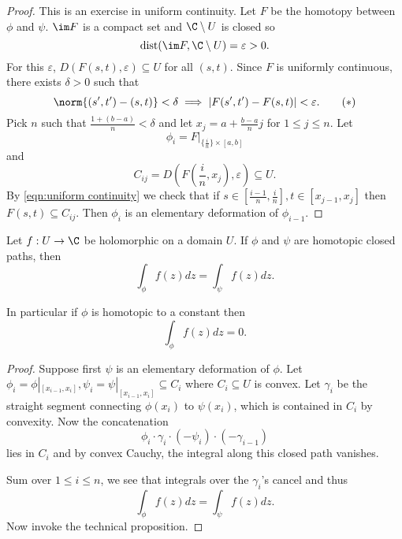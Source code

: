 \documentclass[a4paper]{article}
\begin{document}
\begin{proof}
  This is an exercise in uniform continuity. Let \(F\) be the homotopy between \(\phi\) and \(\psi\). \(\im F\) is a compact set and \(\C \setminus U\) is closed so
  \[
    \operatorname{dist}(\im F, \C \setminus U) = \varepsilon > 0.
  \]
  For this \(\varepsilon\), \(D(F(s, t), \varepsilon) \subseteq U\) for all \((s, t)\). Since \(F\) is uniformly continuous, there exists \(\delta > 0\) such that
  \begin{equation}
    \label{eqn:uniform continuity}
    \norm{(s', t') - (s, t)} < \delta \implies |F(s', t') - F(s, t)| < \varepsilon.
    \tag{\(\ast\)}
  \end{equation}
  Pick \(n\) such that \(\frac{1 + (b - a)}{n} < \delta\) and let \(x_j = a + \frac{b - a}{n}j\) for \(1 \leq j \leq n\). Let
  \[
    \phi_i = F|_{\{\frac{i}{n}\} \times [a, b]}
  \]
  and
  \[
    C_{ij} = D(F(\frac{i}{n}, x_j), \varepsilon) \subseteq U.
  \]
  By \eqref{eqn:uniform continuity} we check that if \(s \in [\frac{i - 1}{n}, \frac{i}{n}], t \in [x_{j - 1}, x_j]\) then \(F(s, t) \subseteq C_{ij}\). Then \(\phi_i\) is an elementary deformation of \(\phi_{i - 1}\).
\end{proof}

\begin{theorem}
  \label{thm:homotopic Cauchy}
  Let \(f: U \to \C\) be holomorphic on a domain \(U\). If \(\phi\) and \(\psi\) are homotopic closed paths, then
  \[
    \int_\phi f(z) dz = \int_\psi f(z) dz.
  \]

  In particular if \(\phi\) is homotopic to a constant then
  \[
    \int_\phi f(z) dz = 0.
  \]
\end{theorem}

\begin{proof}
  Suppose first \(\psi\) is an elementary deformation of \(\phi\). Let \(\phi_i = \phi|_{[x_{i - 1}, x_i]}, \psi_i = \psi|_{[x_{i - 1}, x_i]} \subseteq C_i\) where \(C_i \subseteq U\) is convex. Let \(\gamma_i\) be the straight segment connecting \(\phi(x_i)\) to \(\psi(x_i)\), which is contained in \(C_i\) by convexity. Now the concatenation
  \[
    \phi_i \cdot \gamma_i \cdot (-\psi_i) \cdot (-\gamma_{i - 1})
  \]
  lies in \(C_i\) and by convex Cauchy, the integral along this closed path vanishes.

  Sum over \(1 \leq i \leq n\), we see that integrals over the \(\gamma_i\)'s cancel and thus
  \[
    \int_\phi f(z) dz = \int_\psi f(z) dz.
  \]
  Now invoke the technical proposition.
\end{proof}
\end{document}
